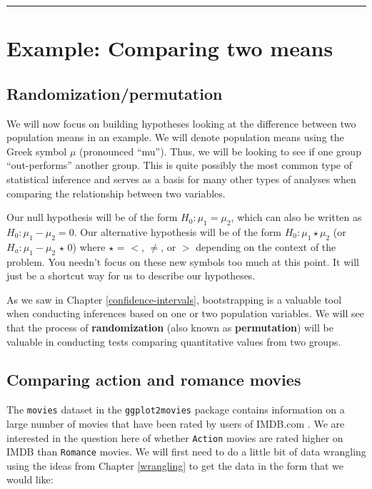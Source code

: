\documentclass[12pt, krantz2,]{krantz}
\begin{document}
\begin{center}\rule{0.5\linewidth}{\linethickness}\end{center}

\hypertarget{example-comparing-two-means}{%
\section{Example: Comparing two means}\label{example-comparing-two-means}}

\hypertarget{randomizationpermutation}{%
\subsection{Randomization/permutation}\label{randomizationpermutation}}

We will now focus on building hypotheses looking at the difference between two population means in an example. We will denote population means using the Greek symbol \(\mu\) (pronounced ``mu''). Thus, we will be looking to see if one group ``out-performs'' another group. This is quite possibly the most common type of statistical inference and serves as a basis for many other types of analyses when comparing the relationship between two variables.

Our null hypothesis will be of the form \(H_0: \mu_1 = \mu_2\), which can also be written as \(H_0: \mu_1 - \mu_2 = 0\). Our alternative hypothesis will be of the form \(H_0: \mu_1 \star \mu_2\) (or \(H_a: \mu_1 - \mu_2 \, \star \, 0\)) where \(\star\) = \(<\), \(\ne\), or \(>\) depending on the context of the problem. You needn't focus on these new symbols too much at this point. It will just be a shortcut way for us to describe our hypotheses.

As we saw in Chapter \ref{confidence-intervals}, bootstrapping is a valuable tool when conducting inferences based on one or two population variables. We will see that the process of \textbf{randomization} (also known as \textbf{permutation}) will be valuable in conducting tests comparing quantitative values from two groups.

\hypertarget{comparing-action-and-romance-movies}{%
\subsection{Comparing action and romance movies}\label{comparing-action-and-romance-movies}}

The \texttt{movies} dataset in the \texttt{ggplot2movies} package contains information on a large number of movies that have been rated by users of IMDB.com \citep{R-ggplot2movies}. We are interested in the question here of whether \texttt{Action} movies are rated higher on IMDB than \texttt{Romance} movies. We will first need to do a little bit of data wrangling using the ideas from Chapter \ref{wrangling} to get the data in the form that we would like:
\end{document}
